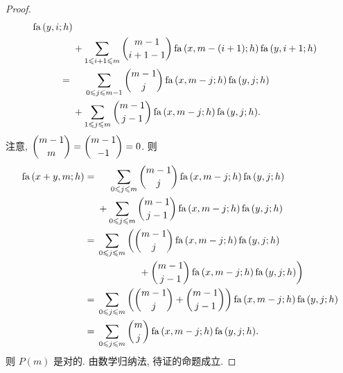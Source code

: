 \documentclass[../libro.tex]{subfiles}
\begin{document}
\begin{proof}
\begin{align*}
{            \operatorname{fa} {(y, i; h)}
        }
        \\
        &
        {} + \sum_{1 \leq i+1 \leq m} {
            \dbinom{m-1}{i+1-1}
            \operatorname{fa} {(x, m - (i + 1); h)}
            \operatorname{fa} {(y, i + 1; h)}
        }
        \\
        = {} &
        \hphantom{{} + {}}
        \sum_{0 \leq j \leq m-1} {
            \dbinom{m-1}{j}
            \operatorname{fa} {(x, m - j; h)}
            \operatorname{fa} {(y, j; h)}
        }
        \\
        &
        {} + \sum_{1 \leq j \leq m} {
            \dbinom{m-1}{j-1}
            \operatorname{fa} {(x, m - j; h)}
            \operatorname{fa} {(y, j; h)}
        }.
    \end{align*}
    注意,
    \(\dbinom{m-1}{m} = \dbinom{m-1}{-1} = 0\).
    则
    \begin{align*}
        \operatorname{fa} {(x + y, m; h)}
        = {} &
        \hphantom{{} + {}}
        \sum_{0 \leq j \leq m} {
            \dbinom{m-1}{j}
            \operatorname{fa} {(x, m - j; h)}
            \operatorname{fa} {(y, j; h)}
        }
        \\
        &
        {} + \sum_{0 \leq j \leq m} {
            \dbinom{m-1}{j-1}
            \operatorname{fa} {(x, m - j; h)}
            \operatorname{fa} {(y, j; h)}
        }
        \\
        = {} &
        \sum_{0 \leq j \leq m} {
            \left( %
            \dbinom{m-1}{j}
            \operatorname{fa} {(x, m - j; h)}
            \operatorname{fa} {(y, j; h)}
            \right. %
        }
        \\
        & \qquad \qquad
        \left. %
        {} + \dbinom{m-1}{j-1}
        \operatorname{fa} {(x, m - j; h)}
        \operatorname{fa} {(y, j; h)}
        \right) %
        \\
        = {} &
        \sum_{0 \leq j \leq m} {
            \left(
                \dbinom{m-1}{j} + \dbinom{m-1}{j-1}
            \right)
            \operatorname{fa} {(x, m - j; h)}
            \operatorname{fa} {(y, j; h)}
        }
        \\
        = {} &
        \sum_{0 \leq j \leq m} {
            \dbinom{m}{j}
            \operatorname{fa} {(x, m - j; h)}
            \operatorname{fa} {(y, j; h)}
        }.
    \end{align*}
    则 \(P(m)\) 是对的.
    由数学归纳法, 待证的命题成立.
\end{proof}
\end{document}

